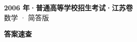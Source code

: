 \documentclass[zihao=-4, a4paper]{ctexart}
\begin{document}
\begin{center}
  {\Large\bfseries 2006 年·普通高等学校招生考试·江苏卷}\\[4pt]
  {\large 数学 · 简答版}
\end{center}
\medskip
{}

\clearpage
{}
\begin{center}{\Large\bfseries 答案速查}\end{center}
\medskip

\end{document}
